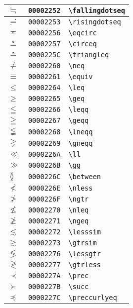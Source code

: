 \begin{longtable}{|l|l|l|}
\hline
$\fallingdotseq$ & \texttt{00002252} & \verb|\fallingdotseq| \\
\hline
$\risingdotseq$ & \texttt{00002253} & \verb|\risingdotseq| \\
\hline
$\eqcirc$ & \texttt{00002256} & \verb|\eqcirc| \\
\hline
$\circeq$ & \texttt{00002257} & \verb|\circeq| \\
\hline
$\triangleq$ & \texttt{0000225C} & \verb|\triangleq| \\
\hline
$\neq$ & \texttt{00002260} & \verb|\neq| \\
\hline
$\equiv$ & \texttt{00002261} & \verb|\equiv| \\
\hline
$\leq$ & \texttt{00002264} & \verb|\leq| \\
\hline
$\geq$ & \texttt{00002265} & \verb|\geq| \\
\hline
$\leqq$ & \texttt{00002266} & \verb|\leqq| \\
\hline
$\geqq$ & \texttt{00002267} & \verb|\geqq| \\
\hline
$\lneqq$ & \texttt{00002268} & \verb|\lneqq| \\
\hline
$\gneqq$ & \texttt{00002269} & \verb|\gneqq| \\
\hline
$\ll$ & \texttt{0000226A} & \verb|\ll| \\
\hline
$\gg$ & \texttt{0000226B} & \verb|\gg| \\
\hline
$\between$ & \texttt{0000226C} & \verb|\between| \\
\hline
$\nless$ & \texttt{0000226E} & \verb|\nless| \\
\hline
$\ngtr$ & \texttt{0000226F} & \verb|\ngtr| \\
\hline
$\nleq$ & \texttt{00002270} & \verb|\nleq| \\
\hline
$\ngeq$ & \texttt{00002271} & \verb|\ngeq| \\
\hline
$\lesssim$ & \texttt{00002272} & \verb|\lesssim| \\
\hline
$\gtrsim$ & \texttt{00002273} & \verb|\gtrsim| \\
\hline
$\lessgtr$ & \texttt{00002276} & \verb|\lessgtr| \\
\hline
$\gtrless$ & \texttt{00002277} & \verb|\gtrless| \\
\hline
$\prec$ & \texttt{0000227A} & \verb|\prec| \\
\hline
$\succ$ & \texttt{0000227B} & \verb|\succ| \\
\hline
$\preccurlyeq$ & \texttt{0000227C} & \verb|\preccurlyeq| \\
\hline

\end{longtable}
